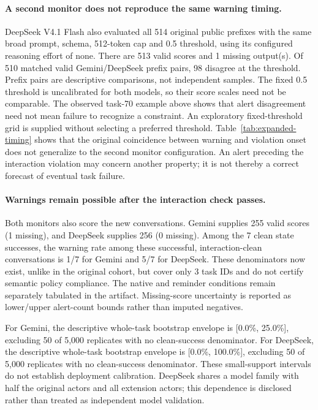 \paragraph{A second monitor does not reproduce the same warning timing.}
DeepSeek V4.1 Flash also evaluated all 514 original public prefixes with the same broad prompt, schema, 512-token cap and 0.5 threshold, using its configured reasoning effort of none. There are 513 valid scores and 1 missing output(s). Of 510 matched valid Gemini/DeepSeek prefix pairs, 98 disagree at the threshold. Prefix pairs are descriptive comparisons, not independent samples. The fixed 0.5 threshold is uncalibrated for both models, so their score scales need not be comparable. The observed task-70 example above shows that alert disagreement need not mean failure to recognize a constraint. An exploratory fixed-threshold grid is supplied without selecting a preferred threshold. Table~\ref{tab:expanded-timing} shows that the original coincidence between warning and violation onset does not generalize to the second monitor configuration. An alert preceding the interaction violation may concern another property; it is not thereby a correct forecast of eventual task failure.

\paragraph{Warnings remain possible after the interaction check passes.}
Both monitors also score the new conversations. Gemini supplies 255 valid scores (1 missing), and DeepSeek supplies 256 (0 missing). Among the 7 clean state successes, the warning rate among these successful, interaction-clean conversations is 1/7 for Gemini and 5/7 for DeepSeek. These denominators now exist, unlike in the original cohort, but cover only 3 task IDs and do not certify semantic policy compliance. The native and reminder conditions remain separately tabulated in the artifact. Missing-score uncertainty is reported as lower/upper alert-count bounds rather than imputed negatives.

For Gemini, the descriptive whole-task bootstrap envelope is [0.0\%, 25.0\%], excluding 50 of 5,000 replicates with no clean-success denominator. For DeepSeek, the descriptive whole-task bootstrap envelope is [0.0\%, 100.0\%], excluding 50 of 5,000 replicates with no clean-success denominator. These small-support intervals do not establish deployment calibration. DeepSeek shares a model family with half the original actors and all extension actors; this dependence is disclosed rather than treated as independent model validation.

